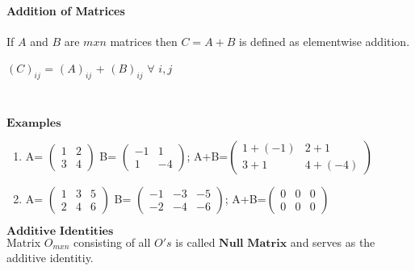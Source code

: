 \documentclass[]{article}
\let\oldparagraph\paragraph
\renewcommand{\paragraph}[1]{\oldparagraph{#1}\mbox{}}
\begin{document}
\paragraph{\texorpdfstring{Addition of Matrices\\
}{Addition of Matrices }}\label{addition-of-matrices}

\begin{tcolorbox}[colback=green!5,colframe=red!40!black,title=Definition]
If $A$ and $B$ are $mxn$ matrices then $C=A+B$ is defined as elementwise addition.

$(C)_{ij}$ = $(A)_{ij}$ + $(B)_{ij}$       $\forall$            ${i,j}$
\end{tcolorbox}

~

\(\mathbf{Examples}\)\\

\begin{enumerate}
\def\labelenumi{\alph{enumi})}
\item
  A= \(\begin{pmatrix} 1 & 2 \\ 3 & 4 \end{pmatrix}\) B=
  \(\begin{pmatrix} -1 & 1 \\ 1 & -4 \end{pmatrix}\);
  A+B=\(\begin{pmatrix} 1+(-1) & 2+1 \\ 3+1 & 4+(-4) \end{pmatrix}\)\\
\item
  A= \(\begin{pmatrix} 1 & 3 & 5 \\ 2 & 4 & 6\end{pmatrix}\) B=
  \(\begin{pmatrix} -1 & -3 & -5 \\ -2 & -4 & -6\end{pmatrix}\);
  A+B=\(\begin{pmatrix} 0 & 0 & 0 \\ 0 & 0 & 0\end{pmatrix}\)\\
\end{enumerate}

\(\textbf{Additive Identities }\)\\

Matrix \(O_{mxn}\) consisting of all \(O's\) is called
\(\textbf{Null Matrix}\) and serves as the additive identitiy.\\
\end{document}
